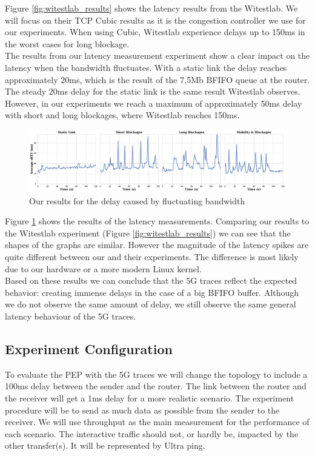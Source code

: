 \documentclass[a4paper,english, 12pt]{report}
\begin{document}
Figure \ref{fig:witestlab_results} shows the latency results from the Witestlab. We will focus on their TCP Cubic results as it is the congestion controller we use for our experiments. When using Cubic, Witestlab experience delays up to 150ms in the worst cases for long blockage.\\

The results from our latency measurement experiment show a clear impact on the latency when the bandwidth fluctuates. With a static link the delay reaches approximately 20ms, which is the result of the 7,5Mb BFIFO queue at the router. The steady 20ms delay for the static link is the same result Witestlab observes. However, in our experiments we reach a maximum of approximately 50ms delay with short and long blockages, where Witestlab reaches 150ms.\\

\begin{figure}[h!] %
	\centering
	\includegraphics[scale=0.25]{../diagrams/witestlab/combined_plots.pdf}
  	\caption{Our results for the delay caused by fluctuating bandwidth}
  	\label{fig:witestlab_graph_delay_1}
\end{figure}

Figure \ref{fig:witestlab_graph_delay_1} shows the results of the latency measurements. Comparing our results to the Witestlab experiment (Figure \ref{fig:witestlab_results}) we can see that the shapes of the graphs are similar. However the magnitude of the latency spikes are quite different between our and their experiments. The difference is most likely due to our hardware or a more modern Linux kernel.\\

Based on these results we can conclude that the 5G traces reflect the expected behavior: creating immense delays in the case of a big BFIFO buffer. Although we do not observe the same amount of delay, we still observe the same general latency behaviour of the 5G traces.

\subsection{Experiment Configuration}
To evaluate the PEP with the 5G traces we will change the topology to include a 100ms delay between the sender and the router. The link between the router and the receiver will get a 1ms delay for a more realistic scenario. The experiment procedure will be to send as much data as possible from the sender to the receiver. We will use throughput as the main measurement for the performance of each scenario. The interactive traffic should not, or hardly be, impacted by the other transfer(s). It will be represented by Ultra ping.
\end{document}
